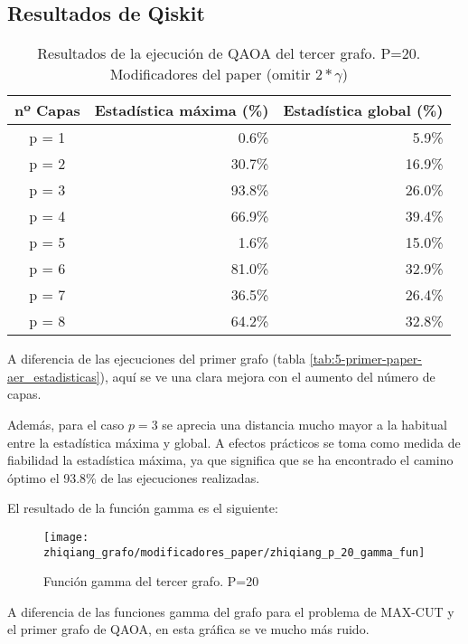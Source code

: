 \documentclass{article}
\begin{document}
\subsection{Resultados de Qiskit}
\begin{table}[htbp]
  \centering
  \begin{tabular}{|c|r|r|}
    \hline
    \textbf{nº Capas} & \textbf{Estadística máxima (\%)} & \textbf{Estadística global (\%)} \\ \hline
    p = 1 &  0.6\% &  5.9\% \\ \hline
    p = 2 & 30.7\% & 16.9\% \\ \hline
    p = 3 & 93.8\% & 26.0\% \\ \hline
    p = 4 & 66.9\% & 39.4\% \\ \hline  %
    p = 5 &  1.6\% & 15.0\% \\ \hline  %
    p = 6 & 81.0\% & 32.9\% \\ \hline
    p = 7 & 36.5\% & 26.4\% \\ \hline
    p = 8 & 64.2\% & 32.8\% \\ \hline
  \end{tabular}
  \caption{Resultados de la ejecución de QAOA del tercer grafo. P=20. Modificadores del paper (omitir \(2*\gamma\))}
  \label{tab:5-zhiqiang-aer_estadisticas}
\end{table}

A diferencia de las ejecuciones del primer grafo (tabla \ref{tab:5-primer-paper-aer_estadisticas}), aquí se ve una clara mejora con el aumento del número de capas.

Además, para el caso \(p = 3\) se aprecia una distancia mucho mayor a la habitual entre la estadística máxima y global. A efectos prácticos se toma como medida de fiabilidad la estadística máxima, ya que significa que se ha encontrado el camino óptimo el 93.8\% de las ejecuciones realizadas.

El resultado de la función gamma es el siguiente:
\begin{figure}[htbp]
  \centering
  \texttt{[image: zhiqiang\_grafo/modificadores\_paper/zhiqiang\_p\_20\_gamma\_fun]}
  \caption{Función gamma del tercer grafo. P=20}
\end{figure}
A diferencia de las funciones gamma del grafo para el problema de MAX-CUT y el primer grafo de QAOA, en esta gráfica se ve mucho más ruido.
\end{document}
